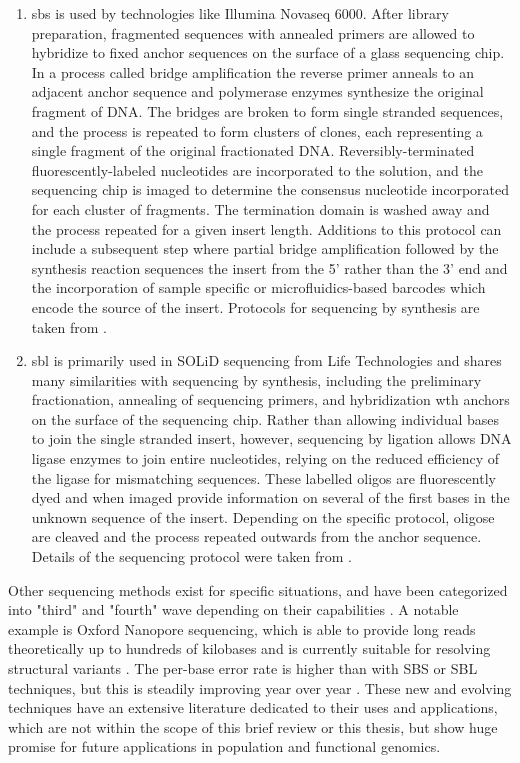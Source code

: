 \begin{enumerate}
    \item \Gls{sbs} is used by technologies like Illumina Novaseq 6000. After library preparation, fragmented sequences with annealed primers are allowed to hybridize to fixed anchor sequences on the surface of a glass sequencing chip. In a process called bridge amplification the reverse primer anneals to an adjacent anchor sequence and polymerase enzymes synthesize the original fragment of DNA. The bridges are broken to form single stranded sequences, and the process is repeated to form clusters of clones, each representing a single fragment of the original fractionated DNA. Reversibly-terminated fluorescently-labeled nucleotides are incorporated to the solution, and the sequencing chip is imaged to determine the consensus nucleotide incorporated for each cluster of fragments. The termination domain is washed away and the process repeated for a given insert length. Additions to this protocol can include a subsequent step where partial bridge amplification followed by the synthesis reaction sequences the insert from the 5' rather than the 3' end and the incorporation of sample specific or microfluidics-based barcodes which encode the source of the insert. Protocols for sequencing by synthesis are taken from \textcite{Illumina}.
    \item \Gls{sbl} is primarily used in SOLiD sequencing from Life Technologies and shares many similarities with sequencing by synthesis, including the preliminary fractionation, annealing of sequencing primers, and hybridization wth anchors on the surface of the sequencing chip. Rather than allowing individual bases to join the single stranded insert, however, sequencing by ligation allows DNA ligase enzymes to join entire nucleotides, relying on the reduced efficiency of the ligase for mismatching sequences. These labelled oligos are fluorescently dyed and when imaged provide information on several of the first bases in the unknown sequence of the insert. Depending on the specific protocol, oligose are cleaved and the process repeated outwards from the anchor sequence. Details of the sequencing protocol were taken from \textcite{Slatko2018}.
\end{enumerate}

Other sequencing methods exist for specific situations, and have been categorized into "third" and "fourth" wave depending on their capabilities \cite{Slatko2018}. A notable example is Oxford Nanopore sequencing, which is able to provide long reads theoretically up to hundreds of kilobases and is currently suitable for resolving structural variants \cite{AByrne2019,Bayega2018}. The per-base error rate is higher than with SBS or SBL techniques, but this is steadily improving year over year \cite{Sahlin2021}. These new and evolving techniques have an extensive literature dedicated to their uses and applications, which are not within the scope of this brief review or this thesis, but show huge promise for future applications in population and functional genomics. 


